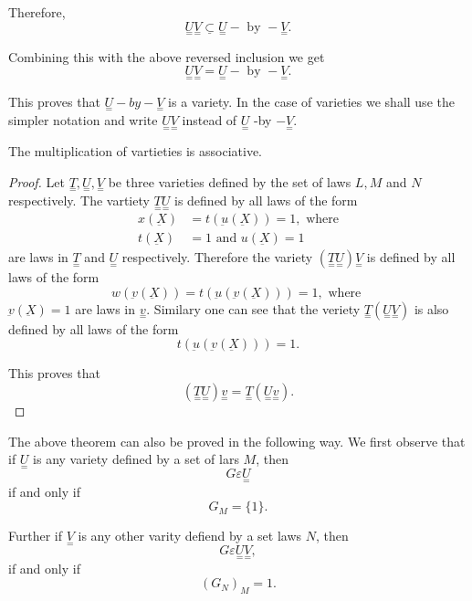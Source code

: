 Therefore,
$$
\underset{=}{U} \underset{=}{V} \underline{\subset} \underset{=}{U} -
\text{ by } - \underset{=}{V}. 
$$

Combining this with the above  reversed inclusion we get
$$
\underset{=}{U}\underset{=}{V} = \underset{=}{U} - \text{ by } -
\underset{=}{V}. 
$$

This proves that $\underset{=} U- by-\underset{=}V$ is a variety. In
the case of varieties we shall use the simpler notation and write
$\underset{=}U \underset{=}V$ instead of $\underset{=}U$ -by
$-\underset{=}V$. 

\begin{Theorem}%
  The multiplication of vartieties is associative. 
\end{Theorem}

\begin{proof}
  Let $\underset{=}{T}, \underset{=}{U}, \underset{=}{V}$ be three
  varieties defined by the set of laws $L, M$ and $N$
  respectively. The vartiety $\underset{=}{T} \underset{=}{U}$ is
  defined by all laws of the form 
  \begin{align*}
    x (\underbar{X}) & = t (\underbar{u} (\underbar{X})) = 1, \text{ where}\\
    t (\underbar{X}) & = 1 \text{ and } u (\underbar{X}) = 1
  \end{align*}
  are laws in $\underset{=}{T}$ and $\underset{=}{U}$
  respectively. Therefore the variety $(\underset{=}{T}
  \underset{=}{U}) \underset{=}{V}$ is defined by all laws of the form 
  $$
  w (\underbar{v} (\underbar{X})) = t (\underbar{u}(\underbar{v}
  (\underbar{X}))) = 1, \text{ where } 
  $$
  $\underbar{v} (\underbar{X}) = 1$ are laws in
  $\underset{=}{v}$. Similary one can see that the veriety
  $\underset{=}{T} (\underset{=}{U} \underset{=}{V})$ is also defined
  by all laws of the form 
  $$
  t (\underbar{u} (\underbar{v}(\underbar{X}))) = 1.
  $$

  This proves that 
  $$
  (\underset{=}{T} \underset{=}{U}) \underset{=}{v} = \underset{=}{T}
  (\underset{=}{U} \underset{=}{v}). 
  $$
\end{proof}

The above theorem can also be proved in the following way. We first
observe that if $\underset{=}{U}$ is any variety defined by a set of
lars $M$, then 
$$
G \varepsilon \underset{=}{U}
$$ 
if and only if
$$
G_M = \{1\}.
$$

Further if $\underset{=}{V}$ is any other varity defiend by a set laws
$N$, then 
$$ 
G \varepsilon \underset{=}{U} \underset{=}{V},
$$
if and only if  
$$
(G_N)_M = 1.
$$

